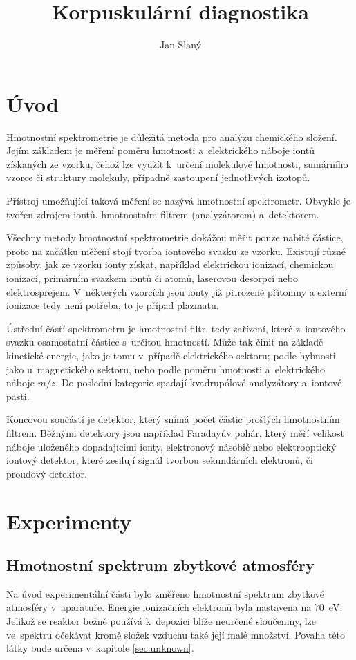 \documentclass{protokol}
\title{Korpuskulární diagnostika}
\author{Jan Slaný}
\newcommand\mz{m/z}
\begin{document}
\header

\section{Úvod}
\label{sec:intro}
Hmotnostní spektrometrie je důležitá metoda pro analýzu chemického složení.
Jejím základem je měření poměru hmotnosti a~elektrického náboje iontů
získaných ze vzorku, čehož lze využít k~určení molekulové hmotnosti,
sumárního vzorce či struktury molekuly,
případně zastoupení jednotlivých izotopů.

Přístroj umožňující taková měření se nazývá hmotnostní spektrometr.
Obvykle je tvořen zdrojem iontů, hmotnostním filtrem (analyzátorem)
a~detektorem.

Všechny metody hmotnostní spektrometrie dokážou měřit pouze nabité částice,
proto na začátku měření stojí tvorba iontového svazku ze vzorku.
Existují různé způsoby, jak ze vzorku ionty získat, například
elektrickou ionizací, chemickou ionizací, primárním svazkem iontů či atomů,
laserovou desorpcí nebo elektrosprejem.
V~některých vzorcích jsou ionty již přirozeně přítomny a externí ionizace
tedy není potřeba, to je případ plazmatu.

Ústřední částí spektrometru je hmotnostní filtr, tedy zařízení,
které z~iontového svazku osamostatní částice s~určitou hmotností.
Může tak činit na základě kinetické energie, jako je tomu v~případě
elektrického sektoru; podle hybnosti jako u~magnetického sektoru,
nebo podle poměru hmotnosti a~elektrického náboje $\mz$.
Do poslední kategorie spadají kvadrupólové analyzátory a~iontové pasti.

Koncovou součástí je detektor, který snímá počet částic prošlých hmotnostním
filtrem.
Běžnými detektory jsou například Faradayův pohár,
který měří velikost náboje uloženého dopadajícími ionty,
elektronový násobič nebo elektrooptický iontový detektor,
které zesilují signál tvorbou sekundárních elektronů,
či proudový detektor.

\section{Experimenty}
\label{sec:experimental}

\subsection{Hmotnostní spektrum zbytkové atmosféry}
\label{sec:residual}
Na úvod experimentální části bylo změřeno hmotnostní spektrum
zbytkové atmosféry v~aparatuře.
Energie ionizačních elektronů byla nastavena na \SI{70}{\electronvolt}.
Jelikož se reaktor bežně používá k~depozici blíže neurčené sloučeniny,
lze ve~spektru očekávat kromě složek vzduchu také její malé množství.
Povaha této látky bude určena v~kapitole \ref{sec:unknown}.
\end{document}

